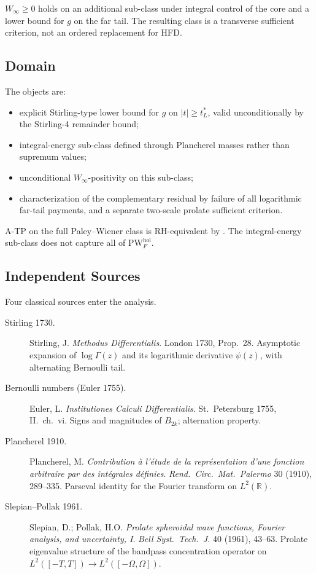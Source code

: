 \(W_{\infty}\ge0\) holds on an additional sub-class under integral
control of the core and a lower bound for \(g\) on the far tail. The
resulting class is a transverse sufficient criterion, not an ordered
replacement for HFD.

\subsection{Domain}
\label{v4-arith:w7-e:domain}

The objects are:
\begin{itemize}
\item explicit Stirling-type lower bound for \(g\) on
\(|t|\geq t_{L}^{\ast}\), valid unconditionally by the Stirling-4
remainder bound;
\item integral-energy sub-class defined through Plancherel masses
rather than supremum values;
\item unconditional \(W_{\infty}\)-positivity on this sub-class;
\item characterization of the complementary residual by failure of
all logarithmic far-tail payments, and a separate two-scale prolate
sufficient criterion.
\end{itemize}

A-TP on the full Paley--Wiener class is RH-equivalent by
. The integral-energy
sub-class does not capture all of \(\mathrm{PW}^{\mathrm{hol}}_{F}\).

\subsection{Independent Sources}
\label{v4-arith:w7-e:sources}

Four classical sources enter the analysis.

\begin{description}
\item[Stirling 1730.] Stirling, J. \emph{Methodus Differentialis}.
London 1730, Prop.~28. Asymptotic expansion of \(\log\Gamma(z)\) and
its logarithmic derivative \(\psi(z)\), with alternating Bernoulli
tail.
\item[Bernoulli numbers (Euler 1755).] Euler, L. \emph{Institutiones
Calculi Differentialis}. St.\ Petersburg 1755, II.\ ch.~vi. Signs
and magnitudes of \(B_{2k}\); alternation property.
\item[Plancherel 1910.] Plancherel, M. \emph{Contribution \`a l'\'etude
de la repr\'esentation d'une fonction arbitraire par des int\'egrales
d\'efinies}. \emph{Rend.~Circ.~Mat.~Palermo} 30 (1910), 289--335.
Parseval identity for the Fourier transform on \(L^{2}(\mathbb{R})\).
\item[Slepian--Pollak 1961.] Slepian, D.; Pollak, H.O. \emph{Prolate
spheroidal wave functions, Fourier analysis, and uncertainty, I}.
\emph{Bell Syst.~Tech.~J.} 40 (1961), 43--63. Prolate eigenvalue
structure of the bandpass concentration operator on
\(L^{2}([-T,T])\to L^{2}([-\Omega,\Omega])\).
\end{description}

